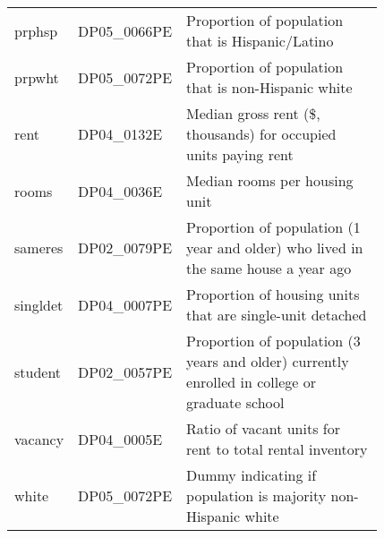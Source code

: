 \begin{tabular}{l p{0.15\linewidth} p{0.675\linewidth}}
	prphsp   & DP05\_0066PE & Proportion of population that is Hispanic/Latino\\
	prpwht   & DP05\_0072PE & Proportion of population that is non-Hispanic white\\
	rent     & DP04\_0132E  & Median gross rent (\$, thousands) for occupied units paying rent\\
	rooms    & DP04\_0036E  & Median rooms per housing unit\\
	sameres  & DP02\_0079PE & Proportion of population (1 year and older) who lived in the same house a year ago\\
	singldet & DP04\_0007PE & Proportion of housing units that are single-unit detached\\
	student  & DP02\_0057PE & Proportion of population (3 years and older) currently enrolled in college or graduate school\\
	vacancy  & DP04\_0005E  & Ratio of vacant units for rent to total rental inventory\\
	white    & DP05\_0072PE & Dummy indicating if population is majority non-Hispanic white\\
	\bottomrule
\end{tabular}
